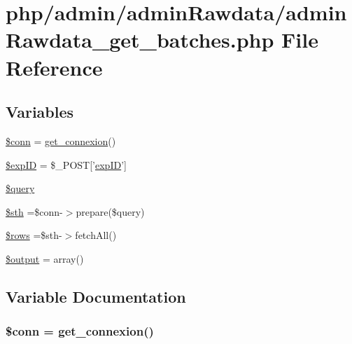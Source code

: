 \hypertarget{admin_rawdata_2admin_rawdata__get__batches_8php}{\section{php/admin/admin\-Rawdata/admin\-Rawdata\-\_\-get\-\_\-batches.php File Reference}
\label{admin_rawdata_2admin_rawdata__get__batches_8php}
}
\subsection*{Variables}
\begin{DoxyCompactItemize}
\item 
\hyperlink{admin_rawdata_2admin_rawdata__get__batches_8php_aa8a5a87b9c1a6a0819b88447cbe41877}{\$conn} = \hyperlink{php__functions_8php_ace18bc10f3fd08f92688ac743e0d8c2e}{get\-\_\-connexion}()
\item 
\hyperlink{admin_rawdata_2admin_rawdata__get__batches_8php_ae384d32e62e85e587cd27bf249ed3db3}{\$exp\-I\-D} = \$\-\_\-\-P\-O\-S\-T\mbox{[}'\hyperlink{admin_rawdata_8php_a888d53a6517f4272b5982c3ca9d16e8a}{exp\-I\-D}'\mbox{]}
\item 
\hyperlink{admin_rawdata_2admin_rawdata__get__batches_8php_af59a5f7cd609e592c41dc3643efd3c98}{\$query}
\item 
\hyperlink{admin_rawdata_2admin_rawdata__get__batches_8php_afa9126f9664959c02795be300a135f93}{\$sth} =\$conn-\/$>$prepare(\$query)
\item 
\hyperlink{admin_rawdata_2admin_rawdata__get__batches_8php_ace2ec39e7df3899fa8df9640ec274b03}{\$rows} =\$sth-\/$>$fetch\-All()
\item 
\hyperlink{admin_rawdata_2admin_rawdata__get__batches_8php_a73004ce9cd673c1bfafd1dc351134797}{\$output} = array()
\end{DoxyCompactItemize}


\subsection{Variable Documentation}
\hypertarget{admin_rawdata_2admin_rawdata__get__batches_8php_aa8a5a87b9c1a6a0819b88447cbe41877}{
\subsubsection[{\$conn}]{\setlength{\rightskip}{0pt plus 5cm}\$conn = {\bf get\-\_\-connexion}()}}\label{admin_rawdata_2admin_rawdata__get__batches_8php_aa8a5a87b9c1a6a0819b88447cbe41877}


